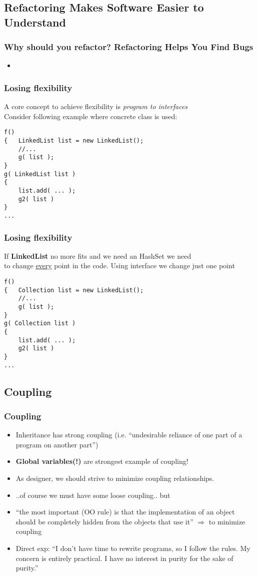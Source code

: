 \documentclass{beamer}
\begin{document}
\subsection{Refactoring Makes Software Easier to Understand}
\begin{frame}
  \frametitle{Why should you refactor? \textbf{Refactoring Helps You Find Bugs}} 
  \begin{itemize}
  		\item<+-> 
		
  \end{itemize}
\end{frame}

\begin{frame}[containsverbatim]
	\frametitle{Losing flexibility}
	A core concept to achieve flexibility is \textit{program to interfaces} \\
	Consider following example where concrete class is used:
	\begin{lstlisting}
f()
{   LinkedList list = new LinkedList();
    //...
    g( list );
}
g( LinkedList list )
{
    list.add( ... );
    g2( list )
}
...
\end{lstlisting}
\end{frame}

\begin{frame}[containsverbatim]
	\frametitle{Losing flexibility}
	If \textbf{LinkedList} no more fits and we need an HashSet we need   \\
	to change \underline{every} point in the code. Using interface we change just one point \\
	\begin{lstlisting}
f()
{   Collection list = new LinkedList();
    //...
    g( list );
}
g( Collection list )
{
    list.add( ... );
    g2( list )
}
...
\end{lstlisting}
\end{frame}

\subsection{Coupling}
\begin{frame}
  \frametitle{Coupling}
  \begin{itemize}
  		\item<+-> Inheritance has strong coupling (i.e. ``undesirable reliance of one part of a program on another part'')
		\item<+-> \textbf{Global variables(!)} are strongest example of coupling! 
		\item<+-> As designer, we should strive to minimize coupling relationships.
		\item<+-> ..of course we must have some loose coupling.. but
		\item<+-> ``the most important (OO rule) is that the implementation of an object should be completely hidden from the objects that use it'' $\Rightarrow$ to minimize coupling
		\item<+-> Direct exp: ``I don't have time to rewrite programs, so I follow the rules. My concern is entirely practical. I have no interest in purity for the sake of purity.''
  \end{itemize}
\end{frame}
\end{document}
